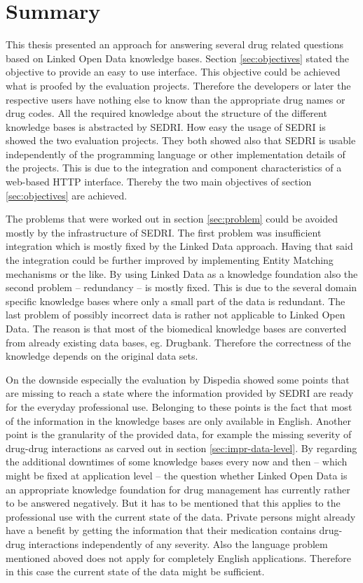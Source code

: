 \chapter{Summary}
\label{cha:summary}

This thesis presented an approach for answering several drug related questions based on Linked Open Data knowledge bases.
Section \ref{sec:objectives} stated the objective to provide an easy to use interface.
This objective could be achieved what is proofed by the evaluation projects.
Therefore the developers or later the respective users have nothing else to know than the appropriate drug names or drug codes.
All the required knowledge about the structure of the different knowledge bases is abstracted by SEDRI.
How easy the usage of SEDRI is showed the two evaluation projects.
They both showed also that SEDRI is usable independently of the programming language or other implementation details of the projects.
This is due to the integration and component characteristics of a web-based HTTP interface.
Thereby the two main objectives of section \ref{sec:objectives} are achieved.

The problems that were worked out in section \ref{sec:problem} could be avoided mostly by the infrastructure of SEDRI.
The first problem was insufficient integration which is mostly fixed by the Linked Data approach.
Having that said the integration could be further improved by implementing Entity Matching mechanisms or the like.
By using Linked Data as a knowledge foundation also the second problem -- redundancy -- is mostly fixed.
This is due to the several domain specific knowledge bases where only a small part of the data is redundant.
The last problem of possibly incorrect data is rather not applicable to Linked Open Data.
The reason is that most of the biomedical knowledge bases are converted from already existing data bases, eg. Drugbank.
Therefore the correctness of the knowledge depends on the original data sets.

On the downside especially the evaluation by Dispedia showed some points that are missing to reach a state where the information provided by SEDRI are ready for the everyday professional use.
Belonging to these points is the fact that most of the information in the knowledge bases are only available in English.
Another point is the granularity of the provided data, for example the missing severity of drug-drug interactions as carved out in section \ref{sec:impr-data-level}.
By regarding the additional downtimes of some knowledge bases every now and then -- which might be fixed at application level -- the question whether Linked Open Data is an appropriate knowledge foundation for drug management has currently rather to be answered negatively. 
But it has to be mentioned that this applies to the professional use with the current state of the data.
Private persons might already have a benefit by getting the information that their medication contains drug-drug interactions independently of any severity.
Also the language problem mentioned aboved does not apply for completely English applications.
Therefore in this case the current state of the data might be sufficient.

